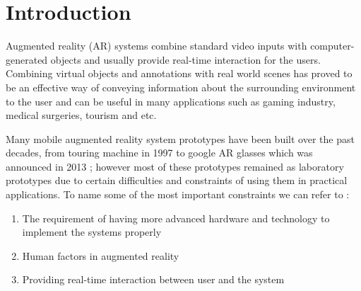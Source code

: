 \documentclass[dvips,letterpaper,12pt]{report}
\begin{document}
\chapter{Introduction}

Augmented reality (AR) systems combine standard video inputs with computer-generated objects and
usually provide real-time interaction for the users. Combining virtual objects and annotations with real
world scenes has proved to be an effective way of conveying information about the surrounding environment to
the user and can be useful in many applications such as gaming industry, medical surgeries, tourism and etc.

Many mobile augmented reality system prototypes have been built over the past decades, from touring machine in 1997 \cite{fei97} 
to google AR glasses which was announced in 2013 \cite{google}; however most of these prototypes remained as laboratory prototypes
due to certain difficulties and constraints of using them in practical applications. To name some of the most important constraints
we can refer to \cite{liv05}:
\begin{enumerate}
\item The requirement of having more advanced hardware and technology to implement the systems properly
\item Human factors in augmented reality
\item Providing real-time interaction between user and the system
\end{enumerate}
\end{document}
